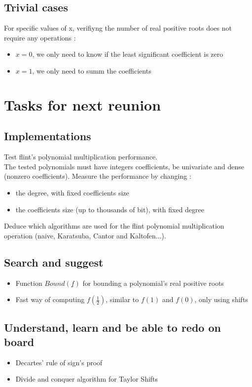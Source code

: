 \documentclass[a4paper,12pt]{article}
\begin{document}
\subsection*{Trivial cases}
For specific values of x, verifiyng the number of real positive roots does not require any operations :
\begin{itemize}
  \item \(x = 0\), we only need to know if the least significant coefficient is zero
  \item \(x= 1\), we only need to summ the coefficients
\end{itemize}

\section{Tasks for next reunion}

\subsection*{Implementations}
Test flint's polynomial multiplication performance.\\
The tested polynomials must have integers coefficients, be univariate and dense (nonzero coefficients).
Measure the performance by changing :
\begin{itemize}
    \item the degree, with fixed coefficients size
    \item the coefficients size (up to thousands of bit), with fixed degree
\end{itemize}
Deduce which algorithms are used for the flint polynomial multiplication operation (naive, Karatsuba, Cantor and Kaltofen...).

\subsection*{Search and suggest}
\begin{itemize}
  \item Function \(Bound(\underline{f})\) for bounding a polynomial's real positive roots
  \item Fast way of computing \(f(\frac{1}{2})\), similar to \(f(1)\) and \(f(0)\), only using shifts
\end{itemize}

\subsection*{Understand, learn and be able to redo on board}
\begin{itemize}
    \item Decartes' rule of sign's proof
    \item Divide and conquer algorithm for Taylor Shifts
\end{itemize}
\end{document}
